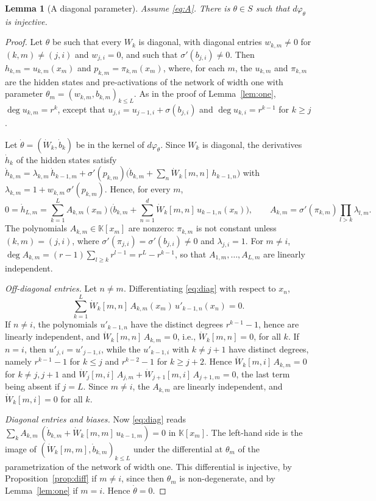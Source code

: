 \documentclass[11pt]{article}
\newtheorem{lemma}{Lemma}
\theoremstyle{definition}
\theoremstyle{remark}
\newcommand{\K}{\mathbb{K}}
\begin{document}
\begin{lemma}[A diagonal parameter]\label{lem:diag}
Assume \eqref{eq:A}. There is $\theta\in S$ such that $d\varphi_\theta$ is injective.
\end{lemma}

\begin{proof}
Let $\theta$ be such that every $W_k$ is diagonal, with diagonal entries $w_{k,m}\ne0$ for $(k,m)\ne(j,i)$ and $w_{j,i}=0$, and such that $\sigma'(b_{j,i})\ne0$. Then $h_{k,m}=u_{k,m}(x_m)$ and $p_{k,m}=\pi_{k,m}(x_m)$, where, for each $m$, the $u_{k,m}$ and $\pi_{k,m}$ are the hidden states and pre-activations of the network of width one with parameter $\theta_m=(w_{k,m},b_{k,m})_{k\le L}$. As in the proof of Lemma~\ref{lem:one}, $\deg u_{k,m}=r^k$, except that $u_{j,i}=u_{j-1,i}+\sigma(b_{j,i})$ and $\deg u_{k,i}=r^{k-1}$ for $k\ge j$.

Let $\dot\theta=(\dot W_k,\dot b_k)$ be in the kernel of $d\varphi_\theta$. Since $W_k$ is diagonal, the derivatives $\dot h_k$ of the hidden states satisfy $\dot h_{k,m}=\lambda_{k,m}\,\dot h_{k-1,m}+\sigma'(p_{k,m})\big(\dot b_{k,m}+\sum_n\dot W_k[m,n]\,h_{k-1,n}\big)$ with $\lambda_{k,m}=1+w_{k,m}\,\sigma'(p_{k,m})$. Hence, for every $m$,
\begin{equation}\label{eq:diag}
0=\dot h_{L,m}=\sum_{k=1}^LA_{k,m}(x_m)\Big(\dot b_{k,m}+\sum_{n=1}^d\dot W_k[m,n]\,u_{k-1,n}(x_n)\Big),\qquad A_{k,m}=\sigma'(\pi_{k,m})\prod_{l>k}\lambda_{l,m}.
\end{equation}
The polynomials $A_{k,m}\in\K[x_m]$ are nonzero: $\pi_{k,m}$ is not constant unless $(k,m)=(j,i)$, where $\sigma'(\pi_{j,i})=\sigma'(b_{j,i})\ne0$ and $\lambda_{j,i}=1$. For $m\ne i$, $\deg A_{k,m}=(r-1)\sum_{l\ge k}r^{l-1}=r^L-r^{k-1}$, so that $A_{1,m},\dots,A_{L,m}$ are linearly independent.

\emph{Off-diagonal entries.} Let $n\ne m$. Differentiating \eqref{eq:diag} with respect to $x_n$,
\[
\sum_{k=1}^L\dot W_k[m,n]\,A_{k,m}(x_m)\,u'_{k-1,n}(x_n)=0.
\]
If $n\ne i$, the polynomials $u'_{k-1,n}$ have the distinct degrees $r^{k-1}-1$, hence are linearly independent, and $\dot W_k[m,n]\,A_{k,m}=0$, i.e., $\dot W_k[m,n]=0$, for all $k$. If $n=i$, then $u'_{j,i}=u'_{j-1,i}$, while the $u'_{k-1,i}$ with $k\ne j+1$ have distinct degrees, namely $r^{k-1}-1$ for $k\le j$ and $r^{k-2}-1$ for $k\ge j+2$. Hence $\dot W_k[m,i]\,A_{k,m}=0$ for $k\ne j,j+1$ and $\dot W_j[m,i]\,A_{j,m}+\dot W_{j+1}[m,i]\,A_{j+1,m}=0$, the last term being absent if $j=L$. Since $m\ne i$, the $A_{k,m}$ are linearly independent, and $\dot W_k[m,i]=0$ for all $k$.

\emph{Diagonal entries and biases.} Now \eqref{eq:diag} reads $\sum_kA_{k,m}\,(\dot b_{k,m}+\dot W_k[m,m]\,u_{k-1,m})=0$ in $\K[x_m]$. The left-hand side is the image of $(\dot W_k[m,m],\dot b_{k,m})_{k\le L}$ under the differential at $\theta_m$ of the parametrization of the network of width one. This differential is injective, by Proposition~\ref{prop:diff} if $m\ne i$, since then $\theta_m$ is non-degenerate, and by Lemma~\ref{lem:one} if $m=i$. Hence $\dot\theta=0$.
\end{proof}
\end{document}

